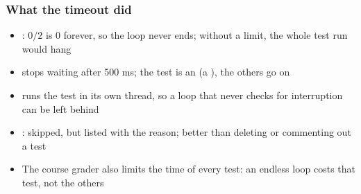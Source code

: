 \documentclass[aspectratio=169,10pt,compress]{beamer}
\begin{document}
\begin{frame}[t,fragile] \frametitle{What the timeout did}

	\begin{itemize}\small
		\item {}: $0 / 2$ is 0 forever, so the loop never ends; without a limit, the whole test run would hang
		\item {} stops waiting after 500 ms; the test is an  (a ), the others go on
		\item {} runs the test in its own thread, so a loop that never checks for interruption can be left behind
		\item {}: skipped, but listed with the reason; better than deleting or commenting out a test
		\item The course grader also limits the time of every test: an endless loop costs that test, not the others
	\end{itemize}
\end{frame}




\end{document}
